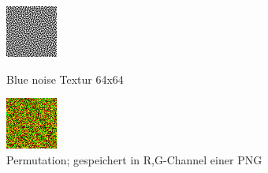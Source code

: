 \begin{figure}[H]
    \centering
    \begin{minipage}[t]{0.45\linewidth}
        \centering
        \includegraphics[interpolate=false,width=\linewidth]{content/simulatedAnnealing/Bilder/LDR_RGBA_0_64-RGBA_r_channel.png}
        \caption{Blue noise Textur 64x64}
    \end{minipage}
    \hfill
    \begin{minipage}[t]{0.45\linewidth}
        \centering
        \includegraphics[interpolate=false,width=\linewidth]{content/simulatedAnnealing/Bilder/permutation_texture_295744_swapsKirkpatrickCooldownSchedule.png}
        \caption{Permutation; gespeichert in R,G-Channel einer PNG}
        \label{pic:Retargeting textur}
    \end{minipage}
\end{figure}

